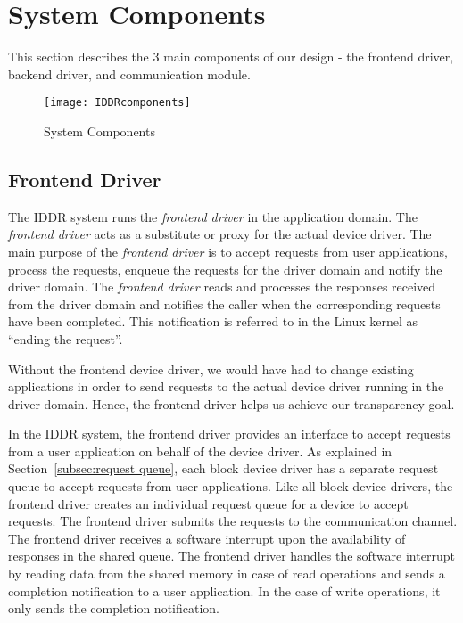 \section{System Components}\label{components}

This section describes the 3 main components of our design 
- the frontend driver, backend driver, and communication module.

\begin{figure}[!ht]
\centering
\texttt{[image: IDDRcomponents]}
\caption{System Components}
\label{fig:Design Evo1}
\end{figure}

\subsection{Frontend Driver}
\label{subsec:frontend}

The IDDR system runs the \textit{frontend
driver} in the application domain. The \textit{frontend driver} acts
as a substitute or proxy for the actual device driver. The main purpose of the
\textit{frontend driver} is to accept requests from user applications,
process the requests, enqueue the requests for the driver domain and
notify the driver domain. The \textit{frontend driver} reads and processes
the responses received from the driver domain and notifies the caller
when the corresponding requests have been completed.  This notification
is referred to in the Linux kernel as ``ending the request''.

Without the frontend device driver, we would have had to change
existing applications in order to send requests to the actual device
driver running in the driver domain. Hence, the
frontend driver helps us achieve our transparency goal.

In the IDDR system, the frontend driver provides an interface to accept
requests from a user application on behalf of the device driver. 
As explained in Section~\ref{subsec:request queue}, each block device
driver has a separate request queue to accept requests from user
applications. Like all block device drivers, the frontend driver
creates an individual request queue for a device to accept requests.
The frontend driver submits the requests to the
communication channel. The frontend driver receives a software interrupt
upon the availability of responses in the shared queue. The frontend
driver handles the software interrupt by reading data from the shared
memory in case of read operations and sends a completion notification to
a user application.  In the case of write operations, it only sends the
completion notification.

